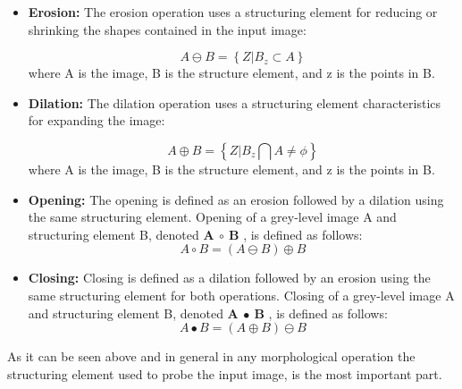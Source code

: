 \begin{itemize}
        \item {\textbf{Erosion:}}
            The erosion operation uses a structuring
            element for reducing or shrinking the shapes contained in the input image:
        
            \begin{equation}
                 A \ominus B = \left\{Z |  B_{z} \subset A \right\}
                \label{equ:Erosion-function}
                \end{equation}
            where A is the image, B is the structure element, and z is the points in B.
                
    \item {\textbf{Dilation:}}
            The dilation operation uses a structuring element characteristics for expanding the image:
        
            \begin{equation}
                A \oplus  B = \left\{Z |  B_{z} \bigcap  A \neq \phi  \right\}
                \label{equ:Dilation-function}
            \end{equation}
            where A is the image, B is the structure element, and z is the points in B.
            \item {\textbf{Opening:}}
            The opening is defined as an erosion followed by a dilation using the same structuring element. Opening of a grey-level image A and structuring element B, denoted \textbf{A $\circ $ B} , is defined as follows:
        \begin{equation}
            A \circ  B = \left ( A \ominus B \right ) \oplus B
            \label{equ:Opening-function}
        \end{equation}
            
            \item {\textbf{Closing:}}
            Closing is defined as a dilation followed by an erosion using the same structuring element for both operations. Closing of a grey-level image A and structuring element B, denoted \textbf{A $\bullet$ B} , is defined as follows:
        \begin{equation}
            A \bullet B = \left ( A \oplus   B \right ) \ominus B
            \label{equ:Clocing-function}
        \end{equation}
            
    \end{itemize}
\noindent
As it can be seen above and in general in any morphological operation the structuring element used to probe the input image, is the most important part.

